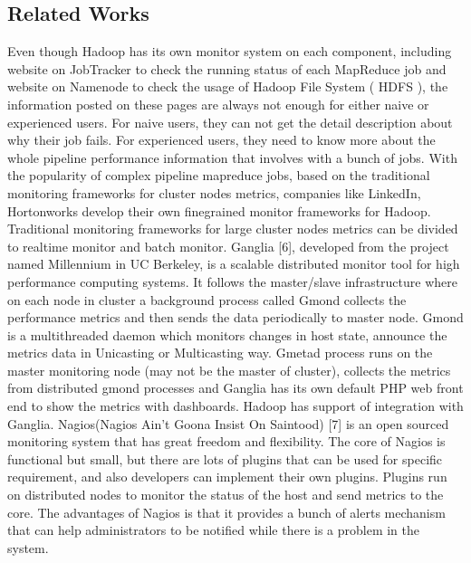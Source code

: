 \subsection{Related Works}
Even though Hadoop has its own monitor system on each component, including website on JobTracker to check the running status of each MapReduce job and website on Namenode to check the usage of Hadoop File System ( HDFS ), the information posted on these pages are always not enough for either naive or experienced users. For naive users, they can not get the detail description about why their job fails. For experienced users, they need to know more about the whole pipeline performance information that involves with a bunch of jobs. With the popularity of complex pipeline mapreduce jobs, based on the traditional monitoring frameworks for cluster nodes metrics, companies like LinkedIn, Hortonworks develop their own fine­grained monitor frameworks for Hadoop.
Traditional monitoring frameworks for large cluster nodes metrics can be divided to real­time monitor and batch monitor.
Ganglia [6], developed from the project named Millennium in UC Berkeley, is a scalable distributed monitor tool for high performance computing systems. It follows the master/slave infrastructure where on each node in cluster a background process called Gmond collects the performance metrics and then sends the data periodically to master node. Gmond is a multi­threaded daemon which monitors changes in host state, announce the metrics data in Unicasting or Multicasting way. Gmetad process runs on the master monitoring node (may not be the master of cluster), collects the metrics from distributed gmond processes and Ganglia has its own default PHP web front end to show the metrics with dashboards. Hadoop has support of integration with Ganglia. Nagios(Nagios Ain’t Goona Insist On Saintood) [7] is an open sourced monitoring system that has great freedom and flexibility. The core of Nagios is functional but small, but there are lots of plugins that can be used for specific requirement, and also developers can implement their own plugins. Plugins run on distributed nodes to monitor the status of the host and send metrics to the core. The advantages of Nagios is that it provides a bunch of alerts mechanism that can help administrators to be notified while there is a problem in the system.
